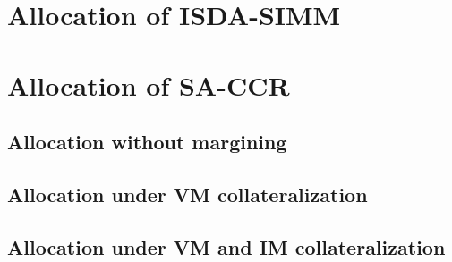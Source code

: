 \documentclass[../Thesis_AHoecherl.tex]{subfiles}
\begin{document}
    \section{Allocation of ISDA-SIMM}
    \section{Allocation of SA-CCR}
    \subsection{Allocation without margining}
    \subsection{Allocation under VM collateralization}
    \subsection{Allocation under VM and IM collateralization}
\end{document}
